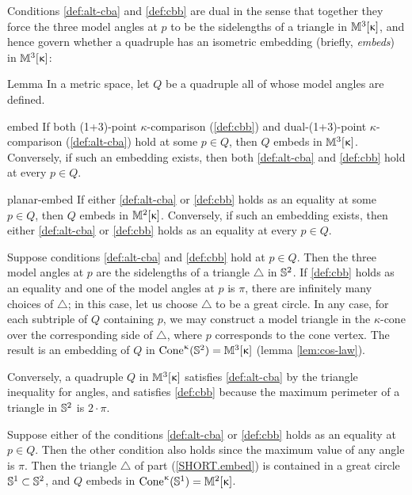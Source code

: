 Conditions \ref{def:alt-cba} and \ref{def:cbb} are dual in the sense that together they force the three model angles at $p$ to be the sidelengths of a triangle in $\mathbb{M}_{{}}^{3}[{\upkappa}]$, and hence  govern whether a quadruple has an isometric embedding (briefly, \emph{embeds}) in $\mathbb{M}_{{}}^{3}[{\upkappa}]$:


\begin{thm}{Lemma}
\label{lem:embedding-angles} 
In a metric space, let $Q$ be a  quadruple all of whose model angles are defined.
\begin{subthm}{embed}
If both  (1+3)-point $\kappa$-comparison (\ref{def:cbb}) and dual-(1+3)-point $\kappa$-comparison (\ref{def:alt-cba}) hold at some $p\in Q$, then $Q$ embeds in $\mathbb{M}_{{}}^{3}[{\upkappa}]$. 
Conversely, if such an embedding exists, then both \ref{def:alt-cba} and \ref{def:cbb} hold at every $p\in Q$. 
\end{subthm}
\begin{subthm}{planar-embed}
If either \ref{def:alt-cba} or \ref{def:cbb} holds as an equality at some $p\in Q$, then 
$Q$ embeds in  $\mathbb{M}_{{}}^{2}[{\upkappa}]$.  Conversely, if such an embedding exists, then either \ref{def:alt-cba} or \ref{def:cbb} holds as an equality at every $p\in Q$.
\end{subthm}
\end{thm}


 Suppose conditions  \ref{def:alt-cba} and \ref{def:cbb} hold at $p\in Q$.  Then the three model angles at $p$ are the sidelengths of a triangle $\triangle$ in $\mathbb{S}^2$.  If  \ref{def:cbb} holds as an equality and one of the model angles at $p$ is $\pi$, there are infinitely many choices of $\triangle$;  in this case, let us choose $\triangle$ to be a great circle.   In any case, for each subtriple of $Q$ containing $p$, we may construct a model triangle in the $\kappa$-cone over the corresponding side of  $\triangle$, where $p$ corresponds to the cone vertex.  The result is an embedding of $Q$ in $\mathop{\rm Cone}\nolimits^{\upkappa}(\mathbb{S}^2) = \mathbb{M}_{{}}^{3}[{\upkappa}]$ (lemma \ref{lem:cos-law}).

Conversely, a quadruple $Q$ in $\mathbb{M}_{{}}^{3}[{\upkappa}]$ satisfies \ref{def:alt-cba} by the triangle inequality for angles, and  satisfies \ref{def:cbb} because the maximum perimeter of a triangle in $\mathbb{S}^2$ is $2\cdot\pi$.
 

 Suppose either of the conditions \ref{def:alt-cba} or \ref{def:cbb} holds as an equality at $p\in Q$. Then the other condition also holds since  the maximum value of any angle is $\pi$.  
Then the triangle $\triangle$ of part (\ref{SHORT.embed}) is contained in a great circle $\SS^1\subset\SS^2$, and $Q$ embeds in $\mathop{\rm Cone}\nolimits^{\upkappa}(\mathbb{S}^1)= \mathbb{M}_{{}}^{2}[{\upkappa}]$. 

